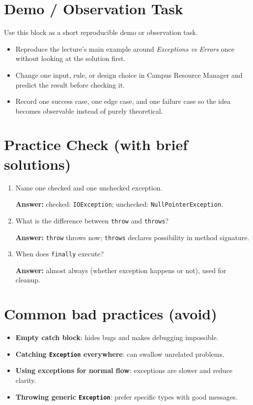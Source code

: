 \documentclass[11pt]{article}
\begin{document}
\section{Demo / Observation Task}
Use this block as a short reproducible demo or observation task.
\begin{itemize}
  \item Reproduce the lecture's main example around \textit{Exceptions vs Errors} once without looking at the solution first.
  \item Change one input, rule, or design choice in Campus Resource Manager and predict the result before checking it.
  \item Record one success case, one edge case, and one failure case so the idea becomes observable instead of purely theoretical.
\end{itemize}
\notesources{\OOPSUnitIIISources}

\section{Practice Check (with brief solutions)}
\begin{enumerate}
  \item Name one checked and one unchecked exception.\par
  \textbf{Answer:} checked: \texttt{IOException}; unchecked: \texttt{NullPointerException}.

  \item What is the difference between \texttt{throw} and \texttt{throws}?\par
  \textbf{Answer:} \texttt{throw} throws now; \texttt{throws} declares possibility in method signature.

  \item When does \texttt{finally} execute?\par
  \textbf{Answer:} almost always (whether exception happens or not), used for cleanup.
\end{enumerate}

\section{Common bad practices (avoid)}
\begin{itemize}
  \item \textbf{Empty catch block}: hides bugs and makes debugging impossible.
  \item \textbf{Catching \texttt{Exception} everywhere}: can swallow unrelated problems.
  \item \textbf{Using exceptions for normal flow}: exceptions are slower and reduce clarity.
  \item \textbf{Throwing generic \texttt{Exception}}: prefer specific types with good messages.
\end{itemize}
\end{document}
